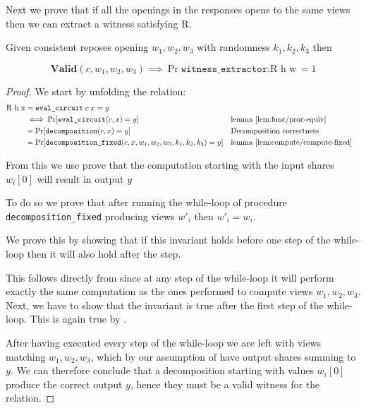 Next we prove that if all the openings in the responses opens to the same views
then we can extract a witness satisfying R.

\begin{lemma}
  \label{lem:zkboo:witness_extraction}
  Given consistent reposes opening $w_{1}, w_{2}, w_{3}$ with randomness
  $k_{1}, k_{2}, k_{3}$ then

  \[
    \textbf{Valid}( c, w_{1}, w_{2}, w_{3} ) \implies \Pr{ \texttt{witness\_{extractor}} : \text{R
    h w} } = 1
  \]
\end{lemma}
\begin{proof}
  We start by unfolding the relation:
  \begin{align*}
    \text{R h x} &= \texttt{eval\_{circuit}} \; c \; x = y \\
                 &\iff \Pr{\texttt{eval\_{circuit}}(c, x) = y} && \text{lemma \ref{lem:func/proc-equiv}}\\
                 &= \Pr{\texttt{decomposition}(c, x) = y} && \text{Decomposition correctness}\\
                 &= \Pr{\texttt{decomposition\_{fixed}}(c, x, w_{1}, w_{2}, w_{3}, k_{1}, k_{2}, k_{3}) = y} && \text{lemma \ref{lem:compute/compute-fixed}}
  \end{align*}

  From this we use  prove that the computation
  starting with the input shares $w_{i}[0]$ will result in output $y$

  To do so we prove that after running the while-loop of procedure
  \texttt{decomposition\_fixed} producing views $w'_{i}$ then $w'_{i} = w_{i}$.

  We prove this by showing that if this invariant holds before one step of
  the while-loop then it will also hold after the step.

  This follows directly from  since at any step of
  the while-loop it will perform exactly the same computation as the ones
  performed to compute views $w_{1}, w_{2}, w_{3}$. Next, we have to show that
  the invariant is true after the first step of the while-loop. This is again
  true by .

  After having executed every step of the while-loop we are left with views
  matching $w_{1}, w_{2}, w_{3}$, which by our assumption of  have output shares summing to $y$. We can therefore conclude that a
  decomposition starting with values $w_{i}[0]$ produce the correct output $y$,
  hence they must be a valid witness for the relation.
\end{proof}

